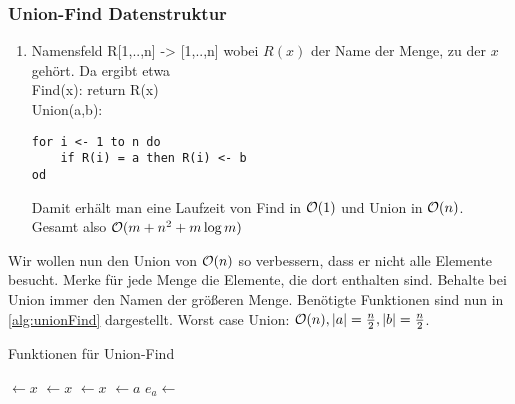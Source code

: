         \subsubsection{Union-Find Datenstruktur}
            \begin{enumerate}
                \item Namensfeld R[1,..,n] -> [1,..,n] wobei $R(x)$ der Name der Menge, zu der $x$ gehört. Da ergibt etwa \\
                Find(x): return R(x) \\
                Union(a,b): \\
\begin{verbatim}
for i <- 1 to n do
    if R(i) = a then R(i) <- b
od
\end{verbatim}
                Damit erhält man eine Laufzeit von Find in $\mathcal{O}(1)$ und Union in $\mathcal{O}(n)$. Gesamt also $\mathcal{O}(m+n^2+m \log m)$
            \end{enumerate}   
            Wir wollen nun den Union von $\mathcal{O}(n)$ so verbessern, dass er nicht alle Elemente besucht.  Merke für jede Menge die Elemente, die dort enthalten sind. Behalte bei Union immer den Namen der größeren Menge. Benötigte Funktionen sind nun in \autoref{alg:unionFind} dargestellt. Worst case Union: $\mathcal{O}(n), \lvert a\rvert = \frac{n}{2}, \lvert b\rvert = \frac{n}{2}$. 
    	\begin{algorithm}
        		\caption{Funktionen für Union-Find}
        		\label{alg:unionFind}
        		\begin{algorithmic}[1]
        				    \State {} $ \gets x$ 
                            \State {} $ \gets x$ 
                            \State {} $ \gets x$
                        \EndFor
        			\EndFunction
        			\Statex
        			    \State \Return {}
        			\EndFunction
        			\Statex
        			     
        			        \State {}
        			    \EndIf
        			        \State {} $ \gets a$  
        			        \State $e_a \gets $  
        			        \State {}
        			    \EndFor
        			\EndFunction  
        		\end{algorithmic}
        	\end{algorithm}
